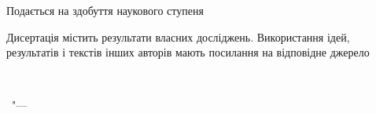 \vspace{0pt plus2.5fill} %
\noindent
Подається на здобуття наукового ступеня
\emph{\thesisDegree}

\vspace{0pt plus4fill} %
\noindent
Дисертація містить результати власних досліджень. Використання ідей, результатів і текстів інших авторів мають посилання на відповідне джерело

\noindent \underline{\hspace{3cm}}\,\thesisAuthorShort

%
\vspace{0pt plus4fill} %
%
\vspace{0pt plus4fill} %
\begin{center}%
{\thesisCity\ "--- \thesisYear}
\end{center}%
\newpage

